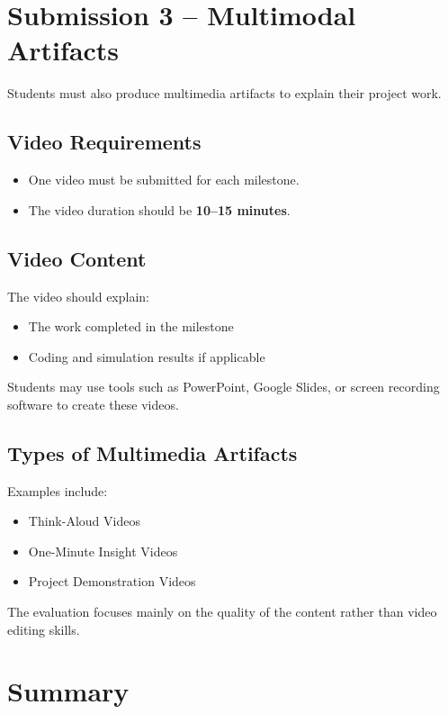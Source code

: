 \documentclass[12pt,a4paper]{article}
\begin{document}
\section{Submission 3 – Multimodal Artifacts}

Students must also produce multimedia artifacts to explain their project work.

\subsection{Video Requirements}

\begin{itemize}
\item One video must be submitted for each milestone.
\item The video duration should be \textbf{10–15 minutes}.
\end{itemize}

\subsection{Video Content}

The video should explain:

\begin{itemize}
\item The work completed in the milestone
\item Coding and simulation results if applicable
\end{itemize}

Students may use tools such as PowerPoint, Google Slides, or screen recording software to create these videos.

\subsection{Types of Multimedia Artifacts}

Examples include:

\begin{itemize}
\item Think-Aloud Videos
\item One-Minute Insight Videos
\item Project Demonstration Videos
\end{itemize}

The evaluation focuses mainly on the quality of the content rather than video editing skills.

\section{Summary}
\end{document}
